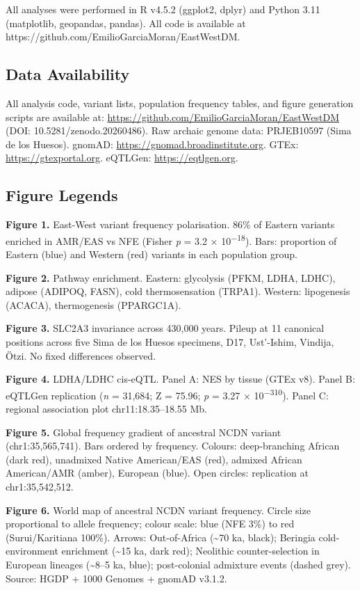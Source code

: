 \documentclass[
  letterpaper,
  DIV=11,
  numbers=noendperiod]{scrartcl}
\begin{document}
All analyses were performed in R v4.5.2 (ggplot2, dplyr) and Python 3.11
(matplotlib, geopandas, pandas). All code is available at
https://github.com/EmilioGarciaMoran/EastWestDM.

\subsection{Data Availability}\label{data-availability}

All analysis code, variant lists, population frequency tables, and
figure generation scripts are available at:
\url{https://github.com/EmilioGarciaMoran/EastWestDM} (DOI:
10.5281/zenodo.20260486). Raw archaic genome data: PRJEB10597 (Sima de
los Huesos). gnomAD: \url{https://gnomad.broadinstitute.org}. GTEx:
\url{https://gtexportal.org}. eQTLGen: \url{https://eqtlgen.org}.

\subsection{Figure Legends}\label{figure-legends}

\textbf{Figure 1.} East-West variant frequency polarisation. 86\% of
Eastern variants enriched in AMR/EAS vs NFE (Fisher \emph{p} = 3.2 ×
10\textsuperscript{−18}). Bars: proportion of Eastern (blue) and Western
(red) variants in each population group.

\textbf{Figure 2.} Pathway enrichment. Eastern: glycolysis (PFKM, LDHA,
LDHC), adipose (ADIPOQ, FASN), cold thermosensation (TRPA1). Western:
lipogenesis (ACACA), thermogenesis (PPARGC1A).

\textbf{Figure 3.} SLC2A3 invariance across 430,000 years. Pileup at 11
canonical positions across five Sima de los Huesos specimens, D17,
Ust'-Ishim, Vindija, Ötzi. No fixed differences observed.

\textbf{Figure 4.} LDHA/LDHC cis-eQTL. Panel A: NES by tissue (GTEx
v8). Panel B: eQTLGen replication (\emph{n} = 31,684; Z = 75.96;
\emph{p} = 3.27 × 10\textsuperscript{−310}). Panel C: regional
association plot chr11:18.35--18.55 Mb.

\textbf{Figure 5.} Global frequency gradient of ancestral NCDN variant
(chr1:35,565,741). Bars ordered by frequency. Colours: deep-branching
African (dark red), unadmixed Native American/EAS (red), admixed African
American/AMR (amber), European (blue). Open circles: replication at
chr1:35,542,512.

\textbf{Figure 6.} World map of ancestral NCDN variant frequency. Circle
size proportional to allele frequency; colour scale: blue (NFE 3\%) to
red (Surui/Karitiana 100\%). Arrows: Out-of-Africa (\textasciitilde70
ka, black); Beringia cold-environment enrichment (\textasciitilde15 ka,
dark red); Neolithic counter-selection in European lineages
(\textasciitilde8--5 ka, blue); post-colonial admixture events (dashed
grey). Source: HGDP + 1000 Genomes + gnomAD v3.1.2.
\end{document}

